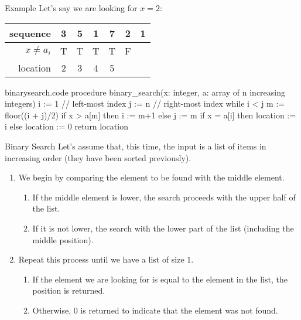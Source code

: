 \documentclass[a4paper]{article}
\begin{document}
\begin{parag}{Example}
    Let's say we are looking for $x = 2$:
    \begin{center}
    \begin{tabular}{r|cccccc}
        sequence & 3 & 5 & 1 & 7 & 2 & 1 \\
        \hline
        $x \neq a_i$ & T & T & T & T & F & \\
        location & 2 & 3 & 4 & 5 &
    \end{tabular}
    \end{center}

\end{parag}

\begin{filecontents*}[overwrite]{binarysearch.code}
procedure binary_search(x: integer, a: array of n increasing integers)
    i := 1  // left-most index
    j := n  // right-most index
    while i < j
        m := floor((i + j)/2)
        if x > a[m] then i := m+1 else j := m
    if x = a[i] then location := i else location := 0
    return location
\end{filecontents*}


\begin{parag}{Binary Search}
    Let's assume that, this time, the input is a list of items in increasing order (they have been sorted previously).

    \begin{enumerate}
        \item We begin by comparing the element to be found with the middle element.
            \begin{enumerate}
                \item If the middle element is lower, the search proceeds with the upper half of the list.
                \item If it is not lower, the search with the lower part of the list (including the middle position).
            \end{enumerate}
        \item Repeat this process until we have a list of size $1$.
            \begin{enumerate}
                \item If the element we are looking for is equal to the element in the list, the position is returned.
                \item Otherwise, 0 is returned to indicate that the element was not found.
            \end{enumerate}
    \end{enumerate}

\end{parag}
\end{document}
